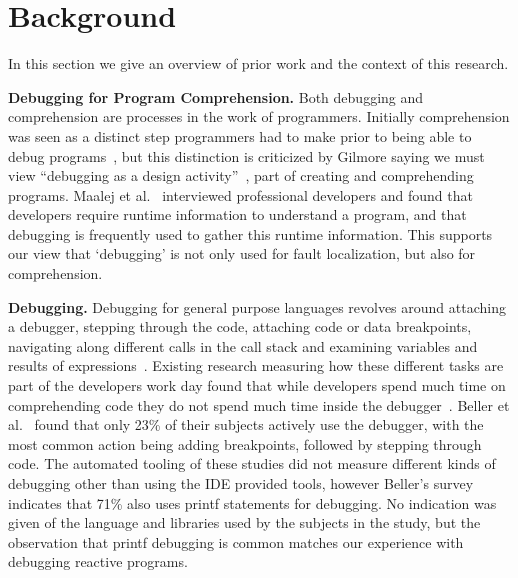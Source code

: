 \section{Background}
\label{background}
In this section we give an overview of prior work 
and the context of this research.

\textbf{Debugging for Program Comprehension.}
Both debugging and comprehension are processes in the work of programmers.
Initially comprehension was seen as a distinct step programmers had to make
prior to being able to debug programs~\cite{katz1987debugging}, 
but this distinction is criticized by Gilmore saying we must view 
``debugging as a design activity''~\cite{gilmore1991models}, 
part of creating and comprehending programs. 
Maalej et al.~\cite{Maalej2014} interviewed professional developers 
and found that developers require runtime information to understand a program,
and that debugging is frequently used to gather this runtime information.
This supports our view that `debugging' is not only used for fault localization,
but also for comprehension.


\textbf{Debugging.}
Debugging for general purpose languages revolves around 
attaching a debugger, 
stepping through the code, 
attaching code or data breakpoints, 
navigating along different calls in the call stack and 
examining variables and results of expressions~\cite{Spinellis2017}.
Existing research measuring how these different tasks are part of the developers work day found that 
while developers spend much time on comprehending code they do not spend much time inside the debugger~\cite{minelli2015know}.
Beller et al.~\cite{beller2017behavior} found that only 23\% of their subjects actively use the debugger,
with the most common action being adding breakpoints, followed by stepping through code.
The automated tooling of these studies did not measure different kinds of debugging other than using the IDE provided tools, 
however Beller's survey indicates that 71\% also uses printf statements for debugging.  
No indication was given of the language and libraries used by the subjects in the study, 
but the observation that printf debugging is common matches our experience with debugging reactive programs.



